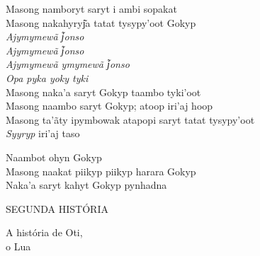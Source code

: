 \begin{linenumbers}\begingroup\raggedright
\noindent Masong namboryt saryt i ambi sopakat\\
Masong nakahyryj͂a tatat tysypy'oot Gokyp\\
\emph{Ajymymewã j͂onso}\\
\emph{Ajymymewã j͂onso}\\
\emph{Ajymymewã ymymewã j͂onso}\\
\emph{Opa pyka yoky tyki}\\
Masong naka'a saryt Gokyp taambo tyki'oot\\
Masong naambo saryt Gokyp; atoop iri'aj hoop\\
Masong ta'ãty ipymbowak atapopi saryt tatat tysypy'oot\\
\emph{Syyryp} iri'aj taso
\end{linenumbers}\endgroup

\bigskip

\begin{linenumbers}\begingroup\raggedright
\noindent Naambot ohyn Gokyp\\
Masong naakat piikyp piikyp harara Gokyp\\
Naka'a saryt kahyt Gokyp pynhadna
\end{linenumbers}\endgroup


\pagebreak
\thispagestyle{empty}
\mbox{}
\begin{center}
\vspace{4cm}
{\formularlight\small SEGUNDA HISTÓRIA}

\medskip

{\formular\huge A história de Oti,\\\vspace{0.2cm} o Lua}
\end{center}
\pagebreak

